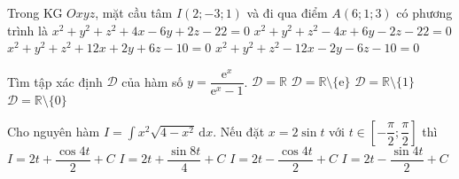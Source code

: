 \begin{ex}%
	Trong KG $Oxyz$, mặt cầu tâm $I(2;-3;1)$ và đi qua điểm $A(6;1;3)$ có phương trình là
	\choice
	{$x^2+y^2+z^2+4x-6y+2z-22=0$}
	{\True $x^2+y^2+z^2-4x+6y-2z-22=0$}
	{$x^2+y^2+z^2+12x+2y+6z-10=0$}
	{$x^2+y^2+z^2-12x-2y-6z-10=0$}
\end{ex}

\begin{ex}%
	Tìm tập xác định $\mathscr{D}$ của hàm số $y=\dfrac{\mathrm{e}^x}{\mathrm{e}^x-1}$.
	\choice
	{$\mathscr{D}=\mathbb{R}$}
	{$\mathscr{D}=\mathbb{R}\setminus \{\mathrm{e}\}$}
	{$\mathscr{D}=\mathbb{R}\setminus \{1\}$}
	{\True $\mathscr{D}=\mathbb{R}\setminus \{0\}$}
\end{ex}

\begin{ex}%
	Cho nguyên hàm $I=\displaystyle\int\limits x^2\sqrt{4-x^2}\mathrm{\,d}x$. Nếu đặt $x=2\sin t$ với $t\in \left[-\dfrac{\pi}{2};\dfrac{\pi}{2}\right]$ thì
	\choice
	{$I=2t+\dfrac{\cos 4t}{2}+C$}
	{$I=2t+\dfrac{\sin 8t}{4}+C$}
	{$I=2t-\dfrac{\cos 4t}{2}+C$}
	{\True $I=2t-\dfrac{\sin 4t}{2}+C$}
\end{ex}

